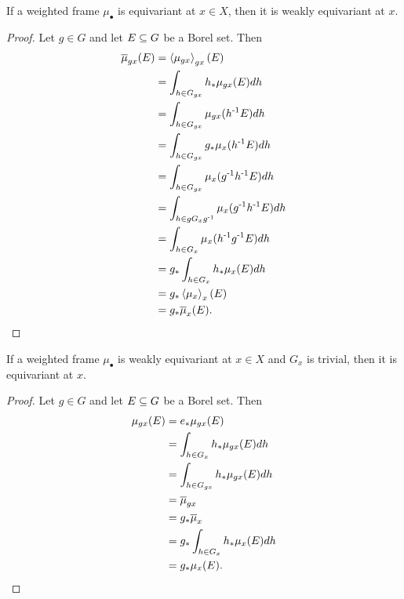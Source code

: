 \begin{remark}
    If a weighted frame $\mu_\bullet$ is equivariant at $x\in X$, then it is weakly equivariant at $x$.
    \begin{proof}
        Let  $g \in G$ and let $E \sub G$ be a Borel set.
        Then
        \begin{align*}
            \Bar{\mu}_{gx}(E)
            &= \angles{\mu_{gx}}_{gx} (E) \\
            &= \int_{h \in G_{gx}} h_* \mu_{gx} (E) dh \\
            &= \int_{h \in G_{gx}} \mu_{gx} (\inv{h} E) dh \\
            &= \int_{h \in G_{gx}} g_* \mu_x (\inv{h} E) dh \\
            &= \int_{h \in G_{gx}} \mu_x (\inv{g} \inv{h} E) dh \\
            &= \int_{h \in gG_x \inv{g}} \mu_x (\inv{g} \inv{h} E) dh \\
            &= \int_{h \in G_x} \mu_x (\inv{h}\inv{g} E) dh \\
            &= g_* \int_{h \in G_x} h_* \mu_x(E) dh \\
            &= g_*\angles{\mu_x}_x (E) \\
            &= g_* \Bar{\mu}_x (E).
        \end{align*}
    \end{proof}
\end{remark}

\begin{remark}
    If a weighted frame $\mu_\bullet$ is weakly equivariant at $x\in X$ and $G_x$ is trivial, then it is equivariant at $x$.
    \begin{proof}
        Let  $g \in G$ and let $E \sub G$ be a Borel set.
        Then
        \begin{align*}
            \mu_{gx} (E)
            &= e_* \mu_{gx} (E) \\
            &= \int_{h \in G_x} h_* \mu_{gx} (E) dh \\
            &= \int_{h \in G_{gx}} h_* \mu_{gx} (E) dh \\
            &= \Bar{\mu}_{gx} \\
            &= g_* \Bar{\mu}_x \\
            &= g_* \int_{h \in G_x} h_* \mu_x (E) dh \\
            &= g_* \mu_x (E).
        \end{align*}
    \end{proof}
\end{remark}

